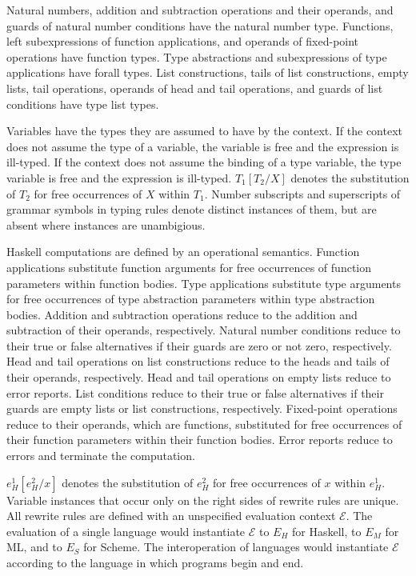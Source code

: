 Natural numbers, addition and subtraction operations and their operands, and guards of natural number conditions have the natural number type.  Functions, left subexpressions of function applications, and operands of fixed-point operations have function types.  Type abstractions and subexpressions of type applications have forall types.  List constructions, tails of list constructions, empty lists, tail operations, operands of head and tail operations, and guards of list conditions have type list types.

Variables have the types they are assumed to have by the context.  If the context does not assume the type of a variable, the variable is free and the expression is ill-typed.  If the context does not assume the binding of a type variable, the type variable is free and the expression is ill-typed.  $T_{1}[T_{2}/X]$ denotes the substitution of $T_{2}$ for free occurrences of $X$ within $T_{1}$.  Number subscripts and superscripts of grammar symbols in typing rules denote distinct instances of them, but are absent where instances are unambigious.

Haskell computations are defined by an operational semantics.  Function applications substitute function arguments for free occurrences of function parameters within function bodies.  Type applications substitute type arguments for free occurrences of type abstraction parameters within type abstraction bodies.  Addition and subtraction operations reduce to the addition and subtraction of their operands, respectively.  Natural number conditions reduce to their true or false alternatives if their guards are zero or not zero, respectively.  Head and tail operations on list constructions reduce to the heads and tails of their operands, respectively.  Head and tail operations on empty lists reduce to error reports.  List conditions reduce to their true or false alternatives if their guards are empty lists or list constructions, respectively.  Fixed-point operations reduce to their operands, which are functions, substituted for free occurrences of their function parameters within their function bodies.  Error reports reduce to errors and terminate the computation.

$e_{H}^{1}[e_{H}^{2}/x]$ denotes the substitution of $e_{H}^{2}$ for free occurrences of $x$ within $e_{H}^{1}$.  Variable instances that occur only on the right sides of rewrite rules are unique.  All rewrite rules are defined with an unspecified evaluation context $\mathscr{E}$.  The evaluation of a single language would instantiate $\mathscr{E}$ to $E_{H}$ for Haskell, to $E_{M}$ for ML, and to $E_{S}$ for Scheme.  The interoperation of languages would instantiate $\mathscr{E}$ according to the language in which programs begin and end.


